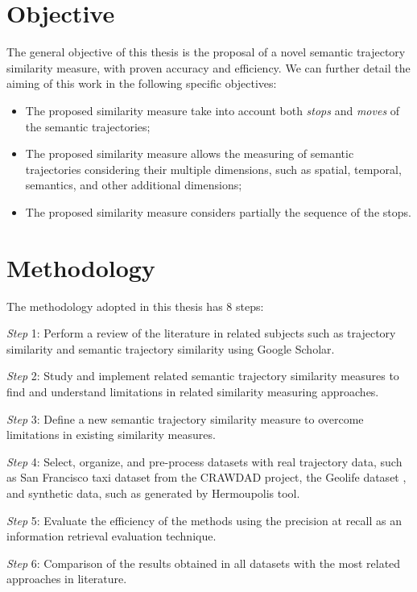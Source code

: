 \section{Objective}

The general objective of this thesis is the proposal of a novel semantic trajectory similarity measure, with proven accuracy and efficiency. We can further detail the aiming of this work in the following specific objectives:

\begin{itemize}
  \item The proposed similarity measure take into account both \emph{stops} and \emph{moves} of the semantic trajectories;
  \item The proposed similarity measure allows the measuring of semantic trajectories considering their multiple dimensions, such as spatial, temporal, semantics, and other additional dimensions;
  \item The proposed similarity measure considers partially the sequence of the stops.
\end{itemize}

\section{Methodology}
The methodology adopted in this thesis has 8 steps:

\textit{Step} 1: Perform a review of the literature in related subjects such as trajectory similarity and semantic trajectory similarity using Google Scholar.

\textit{Step} 2: Study and implement related semantic trajectory similarity measures to find and understand limitations in related similarity measuring approaches.

\textit{Step} 3: Define a new semantic trajectory similarity measure to overcome limitations in existing similarity measures.

\textit{Step} 4: Select, organize, and pre-process datasets with real trajectory data, such as San Francisco taxi dataset from the CRAWDAD project\cite{epfl-mobility-20090224}, the Geolife dataset \cite{zheng2009mining}, and synthetic data, such as generated by Hermoupolis tool\cite{Pelekis-Hermoupolis}.

\textit{Step} 5: Evaluate the efficiency of the methods using the precision at recall \cite{BaezaYatesRibeiroNeto2011} as an information retrieval evaluation technique.

\textit{Step} 6: Comparison of the results obtained in all datasets with the most related approaches in literature.

